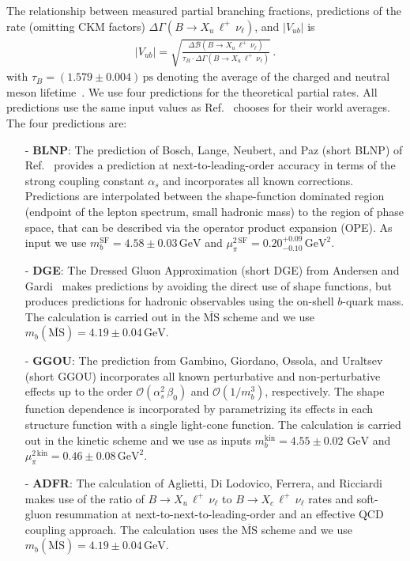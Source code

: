 \documentclass[twocolumn,aps,prd,superscriptaddress,nofootinbib,floatfix,preprintnumbers,a4]{revtex4-1}
\newcommand{\Vub}{V_{ub}}
\newcommand{\bulnu}{\ensuremath{B \to X_u \, \ell^+\, \nu_{\ell}}\xspace}
\newcommand{\bclnu}{\ensuremath{B \to X_c \, \ell^+\, \nu_{\ell}}\xspace}
\begin{document}
The relationship between measured partial branching fractions, predictions of the rate (omitting CKM factors) $\Delta \Gamma(\bulnu)$, and $|\Vub|$ is
\begin{align}\label{eq:vubdet}
|V_{ub}| = \sqrt{ \frac{ \Delta \mathcal{B}(\bulnu) }{ \tau_B \cdot \Delta \Gamma(\bulnu) } } \, .
\end{align}
with $\tau_B = \left(1.579 \pm 0.004\right) \, \text{ps}$ denoting the average of the charged and neutral \PB meson lifetime~\cite{pdg:2020}. We use four predictions for the theoretical partial rates. All predictions use the same input values as Ref.~\cite{Amhis:2019ckw} chooses for their world averages. 
%
%
The four predictions are:
\begin{itemize}
 \item[-] {\bf BLNP}: The prediction of Bosch, Lange, Neubert,  and Paz (short BLNP) of Ref.~\cite{BLNP} provides a prediction at next-to-leading-order accuracy in terms of the strong coupling constant $\alpha_s$ and incorporates all known corrections. Predictions are interpolated between the shape-function dominated region (endpoint of the lepton spectrum, small hadronic mass) to the region of phase space, that can be described via the operator product expansion (OPE). As input we use $m_b^{\mathrm{SF}} = 4.58 \pm 0.03 \, \text{GeV}$ and $\mu_\pi^{2\, \mathrm{SF}} =  0.20 {}^{+0.09}_{-0.10} \, \text{GeV}^2$. \vspace{1ex}
 \item[-] {\bf DGE}: The Dressed Gluon Approximation (short DGE) from Andersen and Gardi~\cite{DGE1,DGE2} makes predictions by avoiding the direct use of shape functions, but produces predictions for hadronic observables using the on-shell $b$-quark mass. The calculation is carried out in the $\overline{\mathrm{MS}}$ scheme and we use $m_b(\overline{\mathrm{MS}}) = 4.19 \pm 0.04 \, \text{GeV}$.
 \item[-] {\bf GGOU}: The prediction from Gambino, Giordano, Ossola, and Uraltsev~\cite{GGOU} (short GGOU) incorporates all known perturbative and non-perturbative effects up to the order $\mathcal{O}(\alpha_s^2 \, \beta_0)$ and $\mathcal{O}(1/m_{b}^3)$, respectively. The shape function dependence is incorporated by parametrizing its effects in each structure function with a single light-cone function. The calculation is carried out in the kinetic scheme and we use as inputs $m_b^{\mathrm{kin}} = 4.55 \pm 0.02 \,\, \text{GeV}$ and $\mu_\pi^{2\, \mathrm{kin}} =  0.46 \pm 0.08 \, \text{GeV}^2$. 
 \item[-] {\bf ADFR}: The calculation of Aglietti, Di Lodovico, Ferrera, and Ricciardi~\cite{ADFR1,ADFR2} makes use of the ratio of \bulnu to \bclnu rates and soft-gluon resummation at next-to-next-to-leading-order and an effective QCD coupling approach. The calculation uses the $\overline{\mathrm{MS}}$ scheme and we use $m_b(\overline{\mathrm{MS}}) = 4.19 \pm 0.04 \, \text{GeV}$.
\end{itemize}
\end{document}

